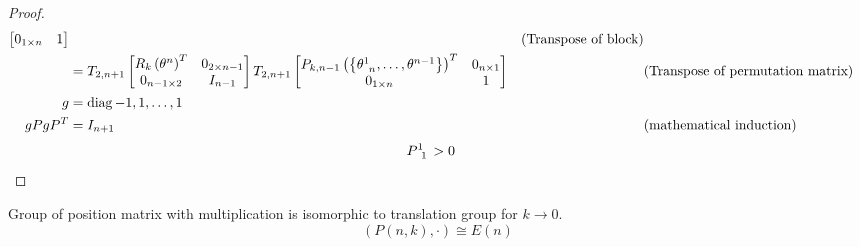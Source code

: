\documentclass[../main.tex]{subfiles}
\begin{document}
\begin{proof}
\begin{align*}
\begin{bmatrix}
            0_{1\times n}                                                                              & 1             \\
        \end{bmatrix} && \text{(Transpose of block)} \\
        &=
        T_{2,n+1}
        \begin{bmatrix}
            R_k\left(\tensor{\theta}{^n}\right)^T & 0_{{2}\times{n-1}} \\
            0_{{n-1}\times{2}}                  & {I}_{n-1}          \\
        \end{bmatrix}
        T_{2,n+1}
        \begin{bmatrix}
            P_{k,n-1}\left(\left\{\tensor{\theta}{^1_{n}},\dots,\tensor{\theta}{^{n-1}}\right\}\right)^T & 0_{n\times 1} \\
            0_{1\times n}                                                                              & 1             \\
        \end{bmatrix} && \text{(Transpose of permutation matrix)} \\
        g
        &= \diag{-1,1,\dots,1} \\
        gPgP^T
        &= I_{n+1} && \text{(mathematical induction)}
    \end{align*}
    \begin{align*}
        \tensor{P}{^1_1} &> 0
    \end{align*}
\end{proof}
\begin{proposition}
    Group of position matrix with multiplication is isomorphic to translation group for $k\to0$.
    \begin{equation*}
        \left(P\left(n, k\right),\cdot\right)\cong E\left(n\right)
    \end{equation*}
\end{proposition}
\end{document}
